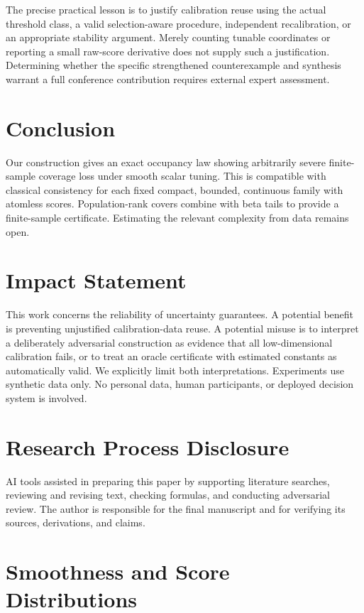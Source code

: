 \documentclass{article}
\begin{document}
The precise practical lesson is to justify calibration reuse using the actual threshold class, a valid selection-aware procedure, independent recalibration, or an appropriate stability argument. Merely counting tunable coordinates or reporting a small raw-score derivative does not supply such a justification. Determining whether the specific strengthened counterexample and synthesis warrant a full conference contribution requires external expert assessment.

\section{Conclusion}

Our construction gives an exact occupancy law showing arbitrarily severe finite-sample coverage loss under smooth scalar tuning. This is compatible with classical consistency for each fixed compact, bounded, continuous family with atomless scores. Population-rank covers combine with beta tails to provide a finite-sample certificate. Estimating the relevant complexity from data remains open.

\section*{Impact Statement}
This work concerns the reliability of uncertainty guarantees. A potential benefit is preventing unjustified calibration-data reuse. A potential misuse is to interpret a deliberately adversarial construction as evidence that all low-dimensional calibration fails, or to treat an oracle certificate with estimated constants as automatically valid. We explicitly limit both interpretations. Experiments use synthetic data only. No personal data, human participants, or deployed decision system is involved.

\section*{Research Process Disclosure}
AI tools assisted in preparing this paper by supporting literature searches, reviewing and revising text, checking formulas, and conducting adversarial review. The author is responsible for the final manuscript and for verifying its sources, derivations, and claims.




\newpage
\appendix
\onecolumn
\section{Smoothness and Score Distributions}\label{app:smooth}
\end{document}
